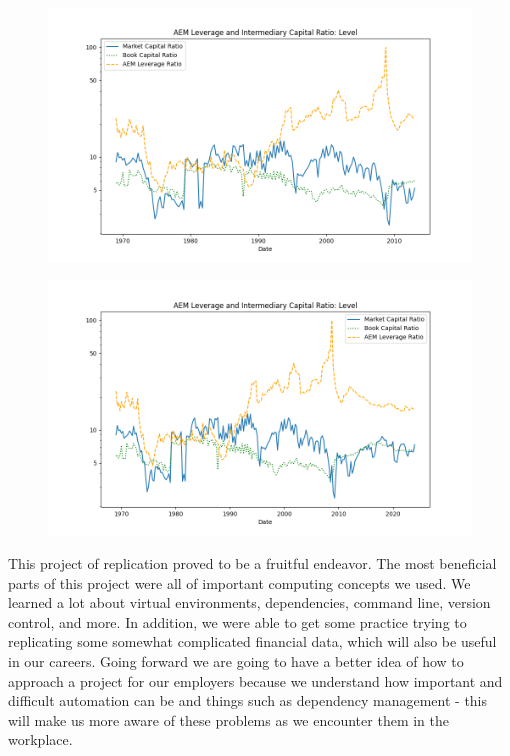 \documentclass{article}
\begin{document}
\clearpage

\begin{figure}[htbp]\centering\includegraphics[width=\linewidth]{table03_figure.png}\end{figure}\clearpage
\begin{figure}[htbp]\centering\includegraphics[width=\linewidth]{updated_table03_figure.png}\end{figure}\clearpage
\clearpage
This project of replication proved to be a fruitful endeavor. The most beneficial parts of this project were all of important computing concepts we used. We learned a lot about virtual environments, dependencies, command line, version control, and more. In addition, we were able to get some practice trying to replicating some somewhat complicated financial data, which will also be useful in our careers.
Going forward we are going to have a better idea of how to approach a project for our employers because we understand how important and difficult automation can be and things such as dependency management - this will make us more aware of these problems as we encounter them in the workplace.\clearpage
\end{document}
